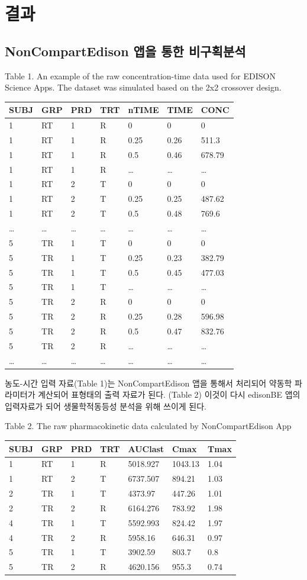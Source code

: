 \documentclass[
  10pt,
]{krantz}
\begin{document}
\hypertarget{result}{%
\section{결과}\label{result}}

\hypertarget{noncompartedison-uxc571uxc744-uxd1b5uxd55c-uxbe44uxad6cuxd68duxbd84uxc11d}{%
\subsection{NonCompartEdison 앱을 통한 비구획분석}\label{noncompartedison-uxc571uxc744-uxd1b5uxd55c-uxbe44uxad6cuxd68duxbd84uxc11d}}

Table 1. An example of the raw concentration-time data used for EDISON Science Apps. The dataset was simulated based on the 2x2 crossover design.

\begin{longtable}[]{@{}lllllll@{}}
\toprule
SUBJ & GRP & PRD & TRT & nTIME & TIME & CONC\tabularnewline
\midrule
\endhead
1 & RT & 1 & R & 0 & 0 & 0\tabularnewline
1 & RT & 1 & R & 0.25 & 0.26 & 511.3\tabularnewline
1 & RT & 1 & R & 0.5 & 0.46 & 678.79\tabularnewline
1 & RT & 1 & R & \ldots{} & \ldots{} & \ldots{}\tabularnewline
1 & RT & 2 & T & 0 & 0 & 0\tabularnewline
1 & RT & 2 & T & 0.25 & 0.25 & 487.62\tabularnewline
1 & RT & 2 & T & 0.5 & 0.48 & 769.6\tabularnewline
\ldots{} & \ldots{} & \ldots{} & \ldots{} & \ldots{} & \ldots{} & \ldots{}\tabularnewline
5 & TR & 1 & T & 0 & 0 & 0\tabularnewline
5 & TR & 1 & T & 0.25 & 0.23 & 382.79\tabularnewline
5 & TR & 1 & T & 0.5 & 0.45 & 477.03\tabularnewline
5 & TR & 1 & T & \ldots{} & \ldots{} & \ldots{}\tabularnewline
5 & TR & 2 & R & 0 & 0 & 0\tabularnewline
5 & TR & 2 & R & 0.25 & 0.28 & 596.98\tabularnewline
5 & TR & 2 & R & 0.5 & 0.47 & 832.76\tabularnewline
5 & TR & 2 & R & \ldots{} & \ldots{} & \ldots{}\tabularnewline
\ldots{} & \ldots{} & \ldots{} & \ldots{} & \ldots{} & \ldots{} & \ldots{}\tabularnewline
\bottomrule
\end{longtable}

농도-시간 입력 자료(Table 1)는 NonCompartEdison 앱을 통해서 처리되어 약동학 파라미터가 계산되어 표형태의 출력 자료가 된다. (Table 2) 이것이 다시 edisonBE 앱의 입력자료가 되어 생물학적동등성 분석을 위해 쓰이게 된다.

Table 2. The raw pharmacokinetic data calculated by NonCompartEdison App

\begin{longtable}[]{@{}lllllll@{}}
\toprule
SUBJ & GRP & PRD & TRT & AUClast & Cmax & Tmax\tabularnewline
\midrule
\endhead
1 & RT & 1 & R & 5018.927 & 1043.13 & 1.04\tabularnewline
1 & RT & 2 & T & 6737.507 & 894.21 & 1.03\tabularnewline
2 & TR & 1 & T & 4373.97 & 447.26 & 1.01\tabularnewline
2 & TR & 2 & R & 6164.276 & 783.92 & 1.98\tabularnewline
4 & TR & 1 & T & 5592.993 & 824.42 & 1.97\tabularnewline
4 & TR & 2 & R & 5958.16 & 646.31 & 0.97\tabularnewline
5 & TR & 1 & T & 3902.59 & 803.7 & 0.8\tabularnewline
5 & TR & 2 & R & 4620.156 & 955.3 & 0.74\tabularnewline
\bottomrule
\end{longtable}
\end{document}
